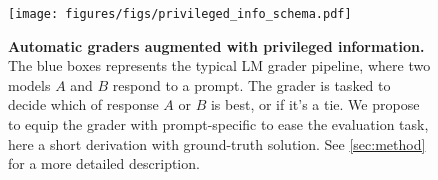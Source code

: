 \begin{figure}[t]
    \begin{center}
        \texttt{[image: figures/figs/privileged\_info\_schema.pdf]}
    \end{center}
    \vspace{-1em}
    \caption{
        \small
        \textbf{Automatic graders augmented with privileged information.}
        The blue boxes represents the typical LM grader pipeline, where two models $A$ and $B$ respond to a prompt.
        The grader is tasked to decide which of response $A$ or $B$ is best, or if it's a tie.
        We propose to equip the grader with prompt-specific \PI to ease the evaluation task, here a short derivation with ground-truth solution.
        See \cref{sec:method} for a more detailed description.
    }
    \label{fig:schema}
\end{figure}
